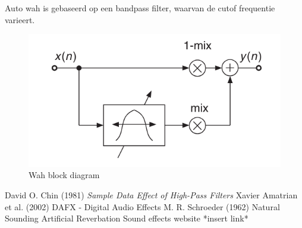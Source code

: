 \documentclass[11pt]{article} %
\begin{document}
Auto wah is gebaseerd op een bandpass filter, waarvan de cutof frequentie varieert.

\begin{figure}
	\centering
	\includegraphics[scale=0.3]{WahBlockDiagram.png}
	\caption{Wah block diagram}
	\label{Fig:WahBlockDiagram}
\end{figure}

\clearpage

\begin{thebibliography}{9}
David  O. Chin (1981) \emph{Sample Data Effect of High-Pass Filters}
Xavier Amatrian et al. (2002) DAFX - Digital Audio Effects
M. R. Schroeder (1962) Natural Sounding Artificial Reverbation
Sound effects website *insert link*
\end{thebibliography}

\clearpage
\listoffigures
\end{document}
